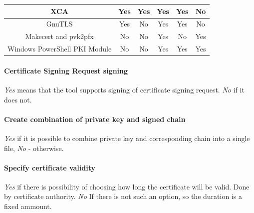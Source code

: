 \documentclass[10pt, a4paper]{report}
\begin{document}
\begin{table}[h!]
\begin{adjustbox}{max width=\textwidth}
\begin{tabular}{|c|c|c|c|c|c|}
XCA                           & \cellcolor[HTML]{34FF34}Yes   & \cellcolor[HTML]{34FF34}Yes              & \cellcolor[HTML]{34FF34}Yes                    & \cellcolor[HTML]{34FF34}Yes                & \cellcolor[HTML]{FE0000}No                                                  \\ \hline
GnuTLS                        & \cellcolor[HTML]{34FF34}Yes   & \cellcolor[HTML]{FE0000}No               & \cellcolor[HTML]{34FF34}Yes                    & \cellcolor[HTML]{34FF34}Yes                & \cellcolor[HTML]{FE0000}No                                                  \\ \hline
Makecert and pvk2pfx          & \cellcolor[HTML]{FE0000}No    & \cellcolor[HTML]{FE0000}No	 	 & \cellcolor[HTML]{34FF34}Yes	               & \cellcolor[HTML]{FE0000}No                 & \cellcolor[HTML]{34FF34}Yes              		                          \\ \hline
Windows PowerShell PKI Module & \cellcolor[HTML]{FE0000}No    & \cellcolor[HTML]{FE0000}No	         & \cellcolor[HTML]{34FF34}Yes	               & \cellcolor[HTML]{34FF34}Yes	            & \cellcolor[HTML]{34FF34}Yes                                                 \\ \hline
\end{tabular}
\end{adjustbox}
\end{table}

\paragraph{Certificate Signing Request signing}

\textit{Yes} means that the tool supports signing of certificate signing request. \textit{No} if it does not.

\paragraph{Create combination of private key and signed chain}

\textit{Yes} if it is possible to combine private key and corresponding chain into a single file, \textit{No} - otherwise.


\paragraph{Specify certificate validity}

\textit{Yes} if there is possibility of choosing how long the certificate will be valid. Done by certificate authority. \textit{No} If there is not such an  option, so the duration is a fixed ammount.
\end{document}
